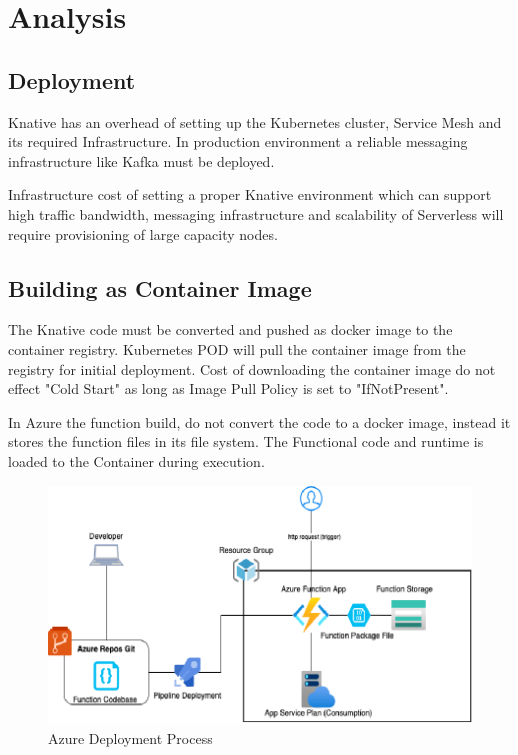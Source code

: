 \documentclass{article}
\begin{document}
\section{Analysis}

\subsection{Deployment}
Knative has an overhead of setting up the Kubernetes cluster, Service Mesh and its required Infrastructure. In production environment a reliable messaging infrastructure like Kafka must be deployed.
\par
Infrastructure cost of setting a proper Knative environment which can support high traffic bandwidth, messaging infrastructure and scalability of Serverless will require provisioning of large capacity nodes.
\par

\subsection{Building as Container Image}

The Knative code must be converted and pushed as docker image to the container registry. 
\hfill\break
Kubernetes POD will pull the container image from the registry for initial deployment. Cost of downloading the container image do not effect "Cold Start" as long as Image Pull Policy is set to "IfNotPresent". 
\par
In Azure the function build, do not convert the code to a docker image, instead it stores the function files in its file system. The Functional code and runtime is loaded to the Container during execution.
\begin{figure}[h]
   \centering
    \includegraphics[scale=1.0]{images/AzureDeploymentProcess.PNG}
    \caption{Azure Deployment Process}
    \label{fig:Deployment Process}
\end{figure}
\end{document}
